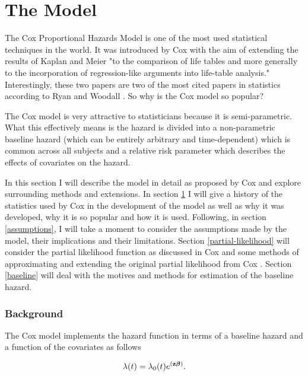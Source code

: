 \newpage
\part{The Model}

The Cox Proportional Hazards Model is one of the most used statistical techniques in the world. It was introduced by Cox  with the aim of extending the results of Kaplan and Meier  "to the comparison of life tables and more generally to the incorporation of regression-like arguments into life-table analysis." Interestingly, these two papers are two of the most cited papers in statistics according to Ryan and Woodall . So why is the Cox model so popular?

The Cox model is very attractive to statisticians because it is semi-parametric. What this effectively means is the hazard is divided into a non-parametric baseline hazard (which can be entirely arbitrary and time-dependent) which is common across all subjects and a relative risk parameter which describes the effects of covariates on the hazard.

In this section I will describe the model in detail as proposed by Cox and explore surrounding methods and extensions. In section \ref{background} I will give a history of the statistics used by Cox in the development of the model as well as why it was developed, why it is so popular and how it is used. Following, in section \ref{assumptions}, I will take a moment to consider the assumptions made by the model, their implications and their limitations. Section \ref{partial-likelihood} will consider the partial likelihood function as discussed in Cox  and some methods of approximating and extending the original partial likelihood from Cox . Section \ref{baseline} will deal with the motives and methods for estimation of the baseline hazard.

\newpage
\section{Background}\label{background}

The Cox model implements the hazard function in terms of a baseline hazard and a function of the covariates as follows

\begin{equation}\label{cox-hazard}
    \lambda(t)=\lambda_0(t)e^{(\textbf{z}\boldsymbol{\beta})}.
\end{equation}

